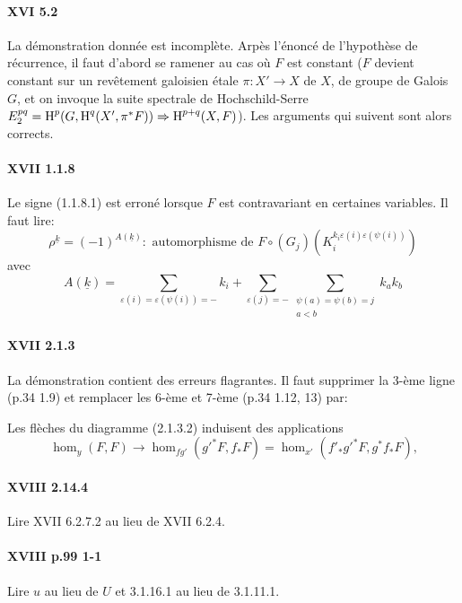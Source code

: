 \documentclass[oneside]{book} %
\begin{document}
\paragraph{XVI 5.2}
La démonstration donnée est incomplète. Arpès l'énoncé de 
l'hypothèse de récurrence, il faut d'abord se ramener au cas o\`u $F$ est 
constant ($F$ devient constant sur un rev\^etement galoisien étale 
$\pi:X'\to X$ de $X$, de groupe de Galois $G$, et on invoque la suite spectrale 
de Hochschild-Serre $E_2^{p q}=\operatorname{H}^p(G,\operatorname{H}^q(X',\pi^\ast F))\Rightarrow \operatorname{H}^{p+q}(X,F)$). 
Les arguments qui suivent sont alors corrects. 

\paragraph{XVII 1.1.8}
Le signe (1.1.8.1) est erroné lorsque $F$ est contravariant en certaines 
variables. Il faut lire: 
\begin{equation*}\tag{1.1.8.1}
  \rho^{\underline k} = (-1)^{A(\underline k)}: \text{ automorphisme de }
F\circ (G_j)\left(K_i^{k_i\varepsilon(i)\varepsilon(\psi(i))}\right) 
\end{equation*}
avec 
\[
  A(\underline k) = \sum_{\varepsilon(i) = \varepsilon(\psi(i))=-} k_i + \sum_{\varepsilon(j)=-} \sum_{\substack{\psi(a)=\psi(b)=j \\ a<b}} k_a k_b 
\]

\paragraph{XVII 2.1.3}
La démonstration contient des erreurs flagrantes. Il faut supprimer la 
3-ème ligne (p.34 1.9) et remplacer les 6-ème et 7-ème (p.34 1.12, 13) 
par: 

Les flèches du diagramme (2.1.3.2) induisent des applications 
\[
  \hom_y(F,F) \to \hom_{f g'}({g'}^\ast F,f_\ast F) = \hom_{x'}(f'_\ast {g'}^\ast F,g^\ast f_\ast F) \text{,}
\]

\paragraph{XVIII 2.14.4}
Lire XVII 6.2.7.2 au lieu de XVII 6.2.4.

\paragraph{XVIII p.99 1-1}
Lire $u$ au lieu de $U$ et 3.1.16.1 au lieu de 3.1.11.1.








\end{document}
